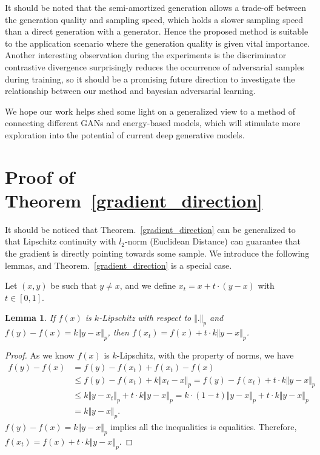 \documentclass{article}
\newtheorem{lemma}{Lemma}
\begin{document}
It should be noted that the semi-amortized generation allows a trade-off between the generation quality and sampling speed, which holds a slower sampling speed than a direct generation with a generator. Hence the proposed method is suitable to the application scenario where the generation quality is given vital importance.  Another interesting observation during the experiments is the discriminator contrastive divergence surprisingly reduces the occurrence of adversarial samples during training, so it should be a promising future direction to investigate the relationship between our method and bayesian adversarial learning. 

We hope our work helps shed some light on a generalized view to a method of connecting different GANs and energy-based models, which will stimulate more exploration into the potential of current deep generative models.


\newpage





\onecolumn
\appendix
\section{Proof of Theorem~\ref{gradient_direction}}\label{proof1}
It should be noticed that Theorem.~\ref{gradient_direction} can be generalized to that Lipschitz continuity with $l_2$-norm (Euclidean Distance) can guarantee that the gradient is directly pointing towards some sample\cite{zhou2019lipschitz}. We introduce the following lemmas, and Theorem.~\ref{gradient_direction} is a special case.  

Let $(x, y)$ be such that $y\neq x $, and we define $x_t = x+ t\cdot (y-x)$ with $t \in [0,1]$. 

\begin{lemma}
If $f(x)$ is $k$-Lipschitz with respect to $\Vert . \Vert_p$ and $f(y)-f(x) = k\Vert y - x \Vert_p$, then $f(x_t) = f(x)+t\cdot k\Vert y - x \Vert_p$.
\end{lemma} 

\begin{proof}
As we know $f(x)$ is $k$-Lipschitz, with the property of norms, we have
\begin{align}\label{eq:linear_interopation}
f(y)-f(x) &= f(y)-f(x_t)+ f(x_t)-f(x) \nonumber \\
& \leq f(y)-f(x_t)+k\Vert x_t-x\Vert_p  = f(y)-f(x_t)+t\cdot k\Vert y - x\Vert_p \nonumber \\
& \leq k\Vert y-x_t\Vert_p+t\cdot k\Vert y - x\Vert_p  = k \cdot (1-t)\Vert y - x\Vert_p+t \cdot k\Vert y - x\Vert_p \nonumber \\
& = k \Vert y - x\Vert_p. 
\end{align}
$f(y)-f(x) = k\Vert y - x \Vert_p$ implies all the inequalities is equalities. Therefore, $f(x_t) = f(x)+t\cdot k\Vert y - x \Vert_p$. \qedhere
\end{proof}
\end{document}
